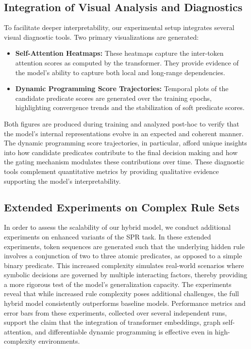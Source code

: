 \documentclass{article}
\begin{document}
\subsection{Integration of Visual Analysis and Diagnostics}
To facilitate deeper interpretability, our experimental setup integrates several visual diagnostic tools. Two primary visualizations are generated:
\begin{itemize}
    \item \textbf{Self-Attention Heatmaps:} These heatmaps capture the inter-token attention scores as computed by the transformer. They provide evidence of the model’s ability to capture both local and long-range dependencies.
    \item \textbf{Dynamic Programming Score Trajectories:} Temporal plots of the candidate predicate scores are generated over the training epochs, highlighting convergence trends and the stabilization of soft predicate scores. 
\end{itemize}
Both figures are produced during training and analyzed post-hoc to verify that the model’s internal representations evolve in an expected and coherent manner. The dynamic programming score trajectories, in particular, afford unique insights into how candidate predicates contribute to the final decision making and how the gating mechanism modulates these contributions over time. These diagnostic tools complement quantitative metrics by providing qualitative evidence supporting the model’s interpretability.

\subsection{Extended Experiments on Complex Rule Sets}
In order to assess the scalability of our hybrid model, we conduct additional experiments on enhanced variants of the SPR task. In these extended experiments, token sequences are generated such that the underlying hidden rule involves a conjunction of two to three atomic predicates, as opposed to a simple binary predicate. This increased complexity simulates real-world scenarios where symbolic decisions are governed by multiple interacting factors, thereby providing a more rigorous test of the model’s generalization capacity. The experiments reveal that while increased rule complexity poses additional challenges, the full hybrid model consistently outperforms baseline models. Performance metrics and error bars from these experiments, collected over several independent runs, support the claim that the integration of transformer embeddings, graph self-attention, and differentiable dynamic programming is effective even in high-complexity environments.
\end{document}
